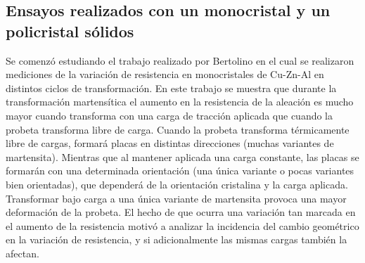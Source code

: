 \documentclass[a4paper,12pt,fleqn,twoside,openany]{book}
\begin{document}



\subsection{Ensayos realizados con un monocristal y un policristal sólidos} \label{PoilicMonocrist}




 
Se comenzó estudiando el trabajo realizado por Bertolino \cite{resistencia} en el cual se realizaron mediciones de la variación de resistencia en monocristales de Cu-Zn-Al en distintos ciclos de transformación. En este trabajo se muestra que durante la transformación martensítica el aumento en la resistencia de la aleación es mucho mayor  cuando transforma con una carga de tracción aplicada que cuando la probeta transforma libre de carga. Cuando la probeta transforma térmicamente libre de cargas, formará placas en distintas direcciones (muchas variantes de martensita). Mientras que al mantener aplicada una carga constante, las placas se formarán con una determinada orientación (una única variante o pocas variantes bien orientadas), que dependerá de la orientación cristalina y la carga aplicada. Transformar bajo carga a una única variante de martensita provoca una mayor deformación de la probeta. El hecho de que ocurra una variación tan marcada en el aumento de la resistencia motivó a analizar la incidencia del cambio geométrico en la variación de resistencia, y si adicionalmente las mismas cargas también la afectan. 
\end{document}
